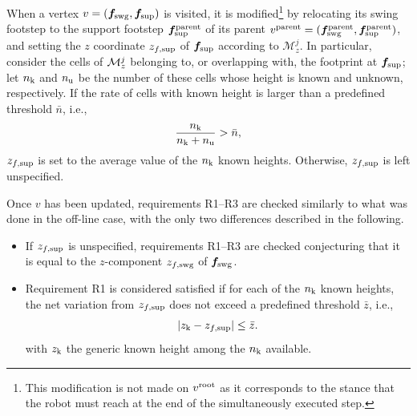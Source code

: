 When a vertex $v = ({\bm{f}}_{\rm swg}, {\bm{f}}_{\rm sup})$ is visited, it is  modified\footnote{This modification is not made on $v^{\rm root}$ as it corresponds to the stance that the robot must reach at the end of the simultaneously executed step.} by relocating its swing footstep to the support footstep ${\bm{f}}_{\rm sup}^{\rm parent}$ of its parent $v^{\rm parent} = ({\bm{f}}_{\rm swg}^{\rm parent}, {\bm{f}}_{\rm sup}^{\rm parent})$, and setting the $z$ coordinate $z_{f, \rm sup}$ of ${\bm{f}}_{\rm sup}$ according to $\mathcal{M}_z^{j}$.
In particular, consider the cells of ${\cal M}_z^j$ belonging to, or overlapping with, the footprint at ${\bm{f}}_{\rm sup}$; let $n_{\rm k}$ and $n_{\rm u}$ be the number of these cells whose height is known and unknown, respectively. If the rate of cells with known height is larger than a predefined threshold $\bar{n}$, i.e.,
\begin{equation*}
    \frac{n_{\rm k}}{n_{\rm k} + n_{\rm u}} > \bar{n},    
\end{equation*}
$z_{f, \rm sup}$ is set to the average value of the $n_{\rm k}$ known heights. 
Otherwise, $z_{f, \rm sup}$ is left unspecified.

Once $v$ has been updated, requirements R1--R3 are checked similarly to what was done in the off-line case, with the only two differences described in the following.
\begin{itemize}
    \item If $z_{f, \rm sup}$ is unspecified, requirements R1--R3 are checked conjecturing that it is equal to the $z$-component $z_{f, \rm swg}$ of ${\bm{f}}_{\rm swg}$.
    \item Requirement R1 is considered satisfied if for each of the $n_{\rm k}$ known heights, the net variation from $z_{f, \rm sup}$ does not exceed a predefined threshold $\bar{z}$, i.e.,
    \begin{equation*}
        |z_{\rm k} - z_{f, \rm sup}| \leq \bar{z}.
    \end{equation*}
    with $z_{\rm k}$ the generic known height among the $n_{\rm k}$ available.
\end{itemize}

